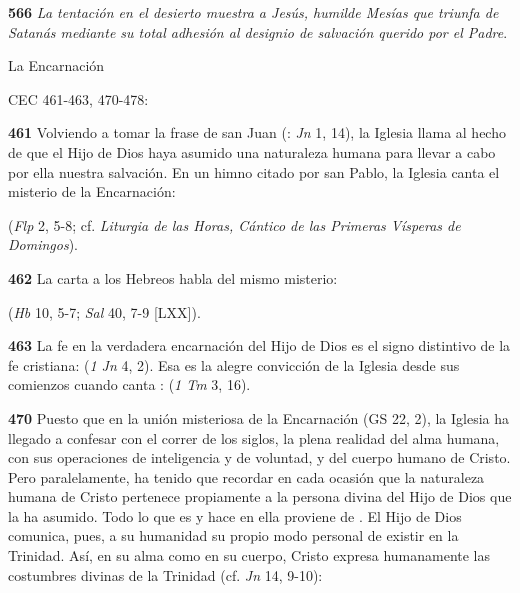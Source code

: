 \textbf{566} \emph{La tentación en el desierto muestra a Jesús, humilde Mesías que triunfa de Satanás mediante su total adhesión al designio de salvación querido por el Padre}.

La Encarnación

CEC 461-463, 470-478:

\textbf{461} Volviendo a tomar la frase de san Juan (: \emph{Jn} 1, 14), la Iglesia llama  al hecho de que el Hijo de Dios haya asumido una naturaleza humana para llevar a cabo por ella nuestra salvación. En un himno citado por san Pablo, la Iglesia canta el misterio de la Encarnación:

 (\emph{Flp} 2, 5-8; cf. \emph{Liturgia de las Horas, Cántico de las Primeras Vísperas de Domingos}).

\textbf{462} La carta a los Hebreos habla del mismo misterio:

 (\emph{Hb} 10, 5-7; \emph{Sal} 40, 7-9 {[}LXX{]}).

\textbf{463} La fe en la verdadera encarnación del Hijo de Dios es el signo distintivo de la fe cristiana:  (\emph{1 Jn} 4, 2). Esa es la alegre convicción de la Iglesia desde sus comienzos cuando canta :  (\emph{1 Tm} 3, 16).

\textbf{470} Puesto que en la unión misteriosa de la Encarnación  (GS 22, 2), la Iglesia ha llegado a confesar con el correr de los siglos, la plena realidad del alma humana, con sus operaciones de inteligencia y de voluntad, y del cuerpo humano de Cristo. Pero paralelamente, ha tenido que recordar en cada ocasión que la naturaleza humana de Cristo pertenece propiamente a la persona divina del Hijo de Dios que la ha asumido. Todo lo que es y hace en ella proviene de . El Hijo de Dios comunica, pues, a su humanidad su propio modo personal de existir en la Trinidad. Así, en su alma como en su cuerpo, Cristo expresa humanamente las costumbres divinas de la Trinidad (cf. \emph{Jn} 14, 9-10):

